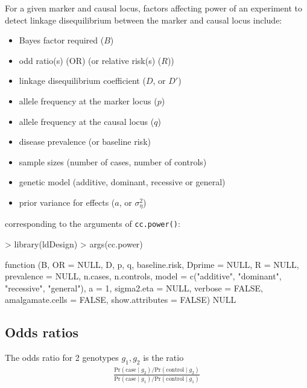 \documentclass[a4paper,10pt]{amsart}
\def\Pr{\mbox{Pr}}
\def\case{\mbox{case}}
\def\control{\mbox{control}}
\begin{document}
For a given marker and causal locus, factors affecting power of an experiment
to detect linkage disequilibrium between the marker and causal locus include:
\begin{itemize}
\item Bayes factor required ($B$)
\item odd ratio(s) (OR) (or relative risk(s) ($R$))
\item linkage disequilibrium coefficient ($D$, or $D'$)
\item allele frequency at the marker locus ($p$)
\item allele frequency at the causal locus ($q$)
\item disease prevalence (or baseline risk)
\item sample sizes (number of cases, number of controls)
\item genetic model (additive, dominant, recessive or general)
\item prior variance for effects ($a$, or $\sigma^2_\eta$)
\end{itemize}
corresponding to the arguments of \texttt{cc.power()}:
\begin{Schunk}
\begin{Sinput}
> library(ldDesign)
> args(cc.power)
\end{Sinput}
\begin{Soutput}
function (B, OR = NULL, D, p, q, baseline.risk, Dprime = NULL, 
    R = NULL, prevalence = NULL, n.cases, n.controls, model = c("additive", 
        "dominant", "recessive", "general"), a = 1, sigma2.eta = NULL, 
    verbose = FALSE, amalgamate.cells = FALSE, show.attributes = FALSE) 
NULL
\end{Soutput}
\end{Schunk}

\subsection{Odds ratios}
The odds ratio for 2 genotypes $g_1, g_2$ is the ratio
\begin{gather}
\frac{\Pr(\case\mid g_2)/\Pr(\control\mid g_2)}{\Pr(\case\mid g_1)/\Pr(\control\mid g_1)}
\end{gather}
\end{document}
